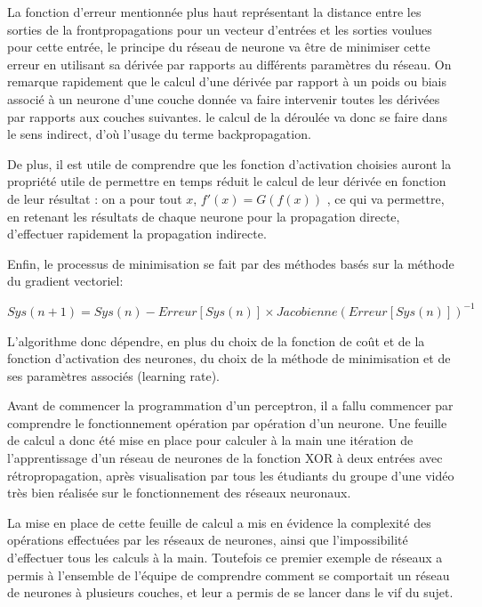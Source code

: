 \documentclass[
    10pt,
    a4paper,
    oneside,
    headinclude,footinclude,
    BCOR=5mm,
    captions=tableabove
]{scrartcl}
\begin{document}
La fonction d'erreur mentionnée plus haut représentant la distance entre les sorties de la frontpropagations pour un vecteur d'entrées et les sorties voulues pour cette entrée, le principe du réseau de neurone va être de minimiser cette erreur en utilisant sa dérivée par rapports au différents paramètres du réseau. On remarque rapidement que le calcul d'une dérivée par rapport à un poids ou biais associé à un neurone d'une couche donnée va faire intervenir toutes les dérivées par rapports aux couches suivantes. le calcul de la déroulée va donc se faire dans le sens indirect, d'où l'usage du terme backpropagation.

De plus, il est utile de comprendre que les fonction d'activation choisies auront la propriété utile de permettre en temps réduit le calcul de leur dérivée en fonction de leur résultat : on a pour tout $x$, $f'(x)=G(f(x))$ , ce qui va permettre, en retenant les résultats de chaque neurone pour la propagation directe, d'effectuer rapidement la propagation indirecte. 

Enfin, le processus de minimisation se fait par des méthodes basés sur la méthode du gradient vectoriel:

 \hspace{4mm} $Sys(n+1) = Sys(n) - Erreur[Sys(n)] \times Jacobienne(Erreur[Sys(n)]) ^{-1} $   

L'algorithme donc dépendre, en plus du choix de la fonction de coût et de la fonction d'activation des neurones, du choix de la méthode de minimisation et de ses paramètres associés (learning rate).
\vspace{5mm}

Avant de commencer la programmation d'un perceptron, il a fallu commencer par comprendre le fonctionnement opération par opération d'un neurone. Une feuille de calcul a donc été mise en place pour calculer à la main une itération de l'apprentissage d'un réseau de neurones de la fonction XOR à deux entrées avec rétropropagation, après visualisation par tous les étudiants du groupe d'une vidéo très bien réalisée sur le fonctionnement des réseaux neuronaux.

La mise en place de cette feuille de calcul a mis en évidence la complexité des opérations effectuées par les réseaux de neurones, ainsi que l'impossibilité d'effectuer tous les calculs à la main. Toutefois ce premier exemple de réseaux a permis à l'ensemble de l'équipe de comprendre comment se comportait un réseau de neurones à plusieurs couches, et leur a permis de se lancer dans le vif du sujet. 
\vspace{30mm}
\end{document}
